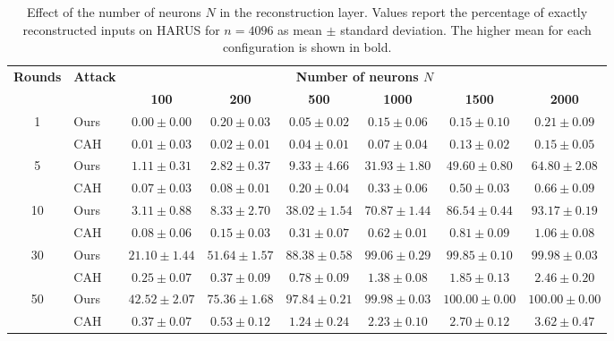 \begin{table}[t]
    \centering
    \footnotesize
    \setlength{\tabcolsep}{3.5pt}
    \renewcommand{\arraystretch}{1.08}
    \caption{Effect of the number of neurons $N$ in the reconstruction layer. Values report the percentage of exactly reconstructed inputs on HARUS for $n=4096$ as mean $\pm$ standard deviation. The higher mean for each configuration is shown in bold.}
    \label{tab:neuron_effect}
    \begin{tabular}{@{}clcccccc@{}}
        \toprule
        \textbf{Rounds} & \textbf{Attack}
        & \multicolumn{6}{c}{\textbf{Number of neurons $N$}} \\
        \cmidrule(l){3-8}
        & & \textbf{100} & \textbf{200} & \textbf{500}
          & \textbf{1000} & \textbf{1500} & \textbf{2000} \\
        \midrule
        \multirow{2}{*}{1}
        & Ours & $0.00 \pm 0.00$ & $\mathbf{0.20} \pm 0.03$ & $\mathbf{0.05} \pm 0.02$
               & $\mathbf{0.15} \pm 0.06$ & $\mathbf{0.15} \pm 0.10$ & $\mathbf{0.21} \pm 0.09$ \\
        & CAH  & $\mathbf{0.01} \pm 0.03$ & $0.02 \pm 0.01$ & $0.04 \pm 0.01$
               & $0.07 \pm 0.04$ & $0.13 \pm 0.02$ & $0.15 \pm 0.05$ \\
        \midrule
        \multirow{2}{*}{5}
        & Ours & $\mathbf{1.11} \pm 0.31$ & $\mathbf{2.82} \pm 0.37$ & $\mathbf{9.33} \pm 4.66$
               & $\mathbf{31.93} \pm 1.80$ & $\mathbf{49.60} \pm 0.80$ & $\mathbf{64.80} \pm 2.08$ \\
        & CAH  & $0.07 \pm 0.03$ & $0.08 \pm 0.01$ & $0.20 \pm 0.04$
               & $0.33 \pm 0.06$ & $0.50 \pm 0.03$ & $0.66 \pm 0.09$ \\
        \midrule
        \multirow{2}{*}{10}
        & Ours & $\mathbf{3.11} \pm 0.88$ & $\mathbf{8.33} \pm 2.70$ & $\mathbf{38.02} \pm 1.54$
               & $\mathbf{70.87} \pm 1.44$ & $\mathbf{86.54} \pm 0.44$ & $\mathbf{93.17} \pm 0.19$ \\
        & CAH  & $0.08 \pm 0.06$ & $0.15 \pm 0.03$ & $0.31 \pm 0.07$
               & $0.62 \pm 0.01$ & $0.81 \pm 0.09$ & $1.06 \pm 0.08$ \\
        \midrule
        \multirow{2}{*}{30}
        & Ours & $\mathbf{21.10} \pm 1.44$ & $\mathbf{51.64} \pm 1.57$ & $\mathbf{88.38} \pm 0.58$
               & $\mathbf{99.06} \pm 0.29$ & $\mathbf{99.85} \pm 0.10$ & $\mathbf{99.98} \pm 0.03$ \\
        & CAH  & $0.25 \pm 0.07$ & $0.37 \pm 0.09$ & $0.78 \pm 0.09$
               & $1.38 \pm 0.08$ & $1.85 \pm 0.13$ & $2.46 \pm 0.20$ \\
        \midrule
        \multirow{2}{*}{50}
        & Ours & $\mathbf{42.52} \pm 2.07$ & $\mathbf{75.36} \pm 1.68$ & $\mathbf{97.84} \pm 0.21$
               & $\mathbf{99.98} \pm 0.03$ & $\mathbf{100.00} \pm 0.00$ & $\mathbf{100.00} \pm 0.00$ \\
        & CAH  & $0.37 \pm 0.07$ & $0.53 \pm 0.12$ & $1.24 \pm 0.24$
               & $2.23 \pm 0.10$ & $2.70 \pm 0.12$ & $3.62 \pm 0.47$ \\
        \bottomrule
    \end{tabular}
\end{table}

